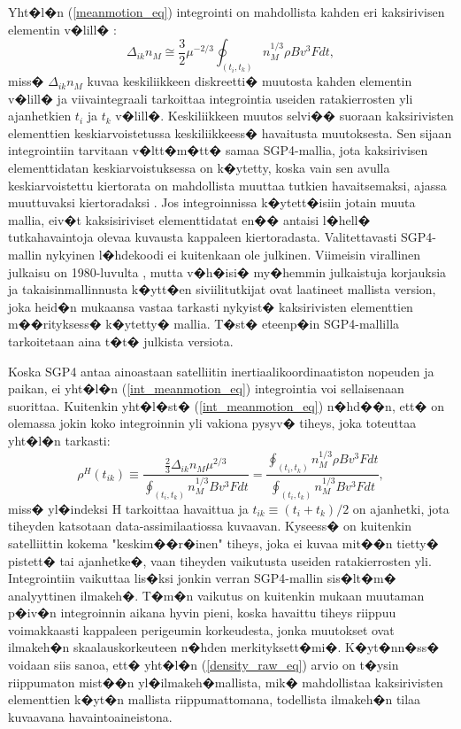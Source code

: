 \documentclass[12pt,a4paper,finnish,margin=2in]{article}
\begin{document}
Yht�l�n (\ref{meanmotion_eq}) integrointi on mahdollista kahden eri kaksirivisen elementin v�lill� \citep{picone_2005}:
\begin{equation} \label{int_meanmotion_eq}
\Delta_{ik}n_M \cong \frac{3}{2} \mu^{-2/3} \oint_{(t_i,t_k)} n_M^{1/3}\rho B v^3 F dt,
\end{equation}
miss� $\Delta_{ik} n_M$ kuvaa keskiliikkeen diskreetti� muutosta kahden elementin v�lill� ja viivaintegraali tarkoittaa integrointia useiden ratakierrosten yli ajanhetkien $t_i$ ja $t_k$ v�lill�. Keskiliikkeen muutos selvi�� suoraan kaksirivisten elementtien keskiarvoistetussa keskiliikkeess� havaitusta muutoksesta. Sen sijaan integrointiin tarvitaan v�ltt�m�tt� samaa SGP4-mallia, jota kaksirivisen elementtidatan keskiarvoistuksessa on k�ytetty, koska vain sen avulla keskiarvoistettu kiertorata on mahdollista muuttaa tutkien havaitsemaksi, ajassa muuttuvaksi kiertoradaksi \citep{hoots_1980}. Jos integroinnissa k�ytett�isiin jotain muuta mallia, eiv�t kaksisiriviset elementtidatat en�� antaisi l�hell� tutkahavaintoja olevaa kuvausta kappaleen kiertoradasta. Valitettavasti SGP4-mallin nykyinen l�hdekoodi ei kuitenkaan ole julkinen. Viimeisin virallinen julkaisu on 1980-luvulta \citep{hoots_1980}, mutta v�h�isi� my�hemmin julkaistuja korjauksia ja takaisinmallinnusta k�ytt�en siviilitutkijat \citet{vallado_2006} ovat laatineet mallista version, joka heid�n mukaansa vastaa tarkasti nykyist� kaksirivisten elementtien m��rityksess� k�ytetty� mallia. T�st� eteenp�in SGP4-mallilla tarkoitetaan aina t�t� julkista versiota.

Koska SGP4 antaa ainoastaan satelliitin inertiaalikoordinaatiston nopeuden ja paikan, ei yht�l�n (\ref{int_meanmotion_eq}) integrointia voi sellaisenaan suorittaa. Kuitenkin yht�l�st� (\ref{int_meanmotion_eq}) n�hd��n, ett� on olemassa jokin koko integroinnin yli vakiona pysyv� tiheys, joka toteuttaa yht�l�n tarkasti:
\begin{equation} \label{density_raw_eq}
\rho^H(t_{ik}) \equiv \frac{\frac{2}{3} \Delta_{ik}n_M \mu^{2/3}}{\oint_{(t_i,t_k)} n_M^{1/3} B v^3 F dt} = \frac{\oint_{(t_i,t_k)} n_M^{1/3}\rho B v^3 F dt}{\oint_{(t_i,t_k)} n_M^{1/3} B v^3 F dt},
\end{equation}
miss� yl�indeksi H tarkoittaa havaittua ja $t_{ik} \equiv (t_i + t_k) / 2$ on ajanhetki, jota tiheyden katsotaan data-assimilaatiossa kuvaavan. Kyseess� on kuitenkin satelliittin kokema "keskim��r�inen" tiheys, joka ei kuvaa mit��n tietty� pistett� tai ajanhetke�, vaan tiheyden vaikutusta useiden ratakierrosten yli. Integrointiin vaikuttaa lis�ksi jonkin verran SGP4-mallin sis�lt�m� analyyttinen ilmakeh�. T�m�n vaikutus on kuitenkin \citet{picone_2005} mukaan muutaman p�iv�n integroinnin aikana hyvin pieni, koska havaittu tiheys riippuu voimakkaasti kappaleen perigeumin korkeudesta, jonka muutokset ovat ilmakeh�n skaalauskorkeuteen n�hden merkityksett�mi�. K�yt�nn�ss� voidaan siis sanoa, ett� yht�l�n (\ref{density_raw_eq}) arvio on t�ysin riippumaton mist��n yl�ilmakeh�mallista, mik� mahdollistaa kaksirivisten elementtien k�yt�n mallista riippumattomana, todellista ilmakeh�n tilaa kuvaavana havaintoaineistona.
\end{document}
